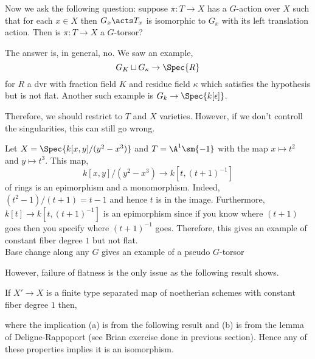 \documentclass[12pt]{article}
\begin{document}
Now we ask the following question: suppose $\pi : T \to X$ has a $G$-action over $X$ such that for each $x \in X$ then $G_x \acts T_x$ is isomorphic to $G_x$ with its left translation action. Then is $\pi : T \to X$ a $G$-torsor? 

\begin{example}
The answer is, in general, no. We saw an example,
\[ G_K \sqcup G_\kappa \to \Spec{R} \]
for $R$ a dvr with fraction field $K$ and residue field $\kappa$ which satisfies the hypothesis but is not flat. Another such example is $G_k \to \Spec{k[\epsilon]}$.
\end{example}

Therefore, we should restrict to $T$ and $X$ varieties. However, if we don't controll the singularities, this can still go wrong.

\begin{example}
Let $X = \Spec{k[x,y]/(y^2 - x^3)}$ and $T = \A^1 \sm \{ - 1 \}$ with the map $x \mapsto t^2$ and $y \mapsto t^3$. This map,
\[ k[x,y]/(y^2 - x^3) \to k[t, (t+1)^{-1}] \]
of rings is an epimorphism and a monomorphism. Indeed, $(t^2 - 1)/(t + 1) = t - 1$ and hence $t$ is in the image. Furthermore, $k[t] \to k[t, (t+1)^{-1}]$ is an epimorphism since if you know where $(t+1)$ goes then you specify where $(t+1)^{-1}$ goes. Therefore, this gives an example of constant fiber degree $1$ but not flat. 
\bigskip\\
Base change along any $G$ gives an example of a pseudo $G$-torsor 
\end{example}

However, failure of flatness is the only issue as the following result shows.

\begin{prop}
If $X' \to X$ is a finite type separated map of noetherian schemes with constant fiber degree $1$ then,
\begin{center}
\end{center}
where the implication (a) is from the following result and (b) is from the lemma of Deligne-Rappoport (see Brian exercise done in previous section). Hence any of these properties implies it is an isomorphism.
\end{prop}
\end{document}
